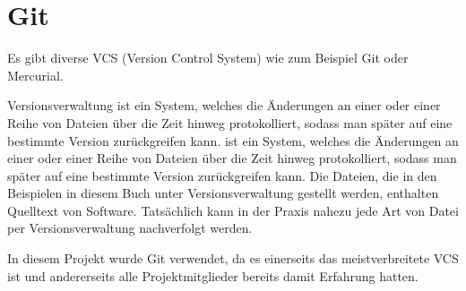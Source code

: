 \renewcommand{\kapitelautor}{Autor: Felix Zwickelstorfer}

\section{Git}\label{sec:git}

Es gibt diverse VCS (Version Control System) wie zum Beispiel Git oder Mercurial.
\begin{coolQuote}Versionsverwaltung ist ein System, welches die Änderungen an einer oder einer Reihe von Dateien über die Zeit hinweg protokolliert, sodass man später auf eine bestimmte Version zurückgreifen kann.
 ist ein System, welches die Änderungen an einer oder einer Reihe von Dateien über die Zeit hinweg protokolliert, sodass man später auf eine bestimmte Version zurückgreifen kann.
Die Dateien, die in den Beispielen in diesem Buch unter Versionsverwaltung gestellt werden, enthalten Quelltext von Software.
Tatsächlich kann in der Praxis nahezu jede Art von Datei per Versionsverwaltung nachverfolgt werden.
\end{coolQuote}

In diesem Projekt wurde Git verwendet, da es einerseits das meistverbreitete VCS ist und andererseits alle Projektmitglieder bereits damit Erfahrung hatten.




